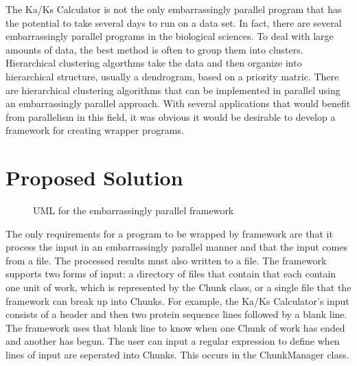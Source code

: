 \documentclass[12pt]{article}
\begin{document}
The Ka/Ks Calculator is not the only embarrassingly parallel program that has the
potential to take several days to run on a data set. In fact, there are several
embarrassingly parallel programs in the biological sciences. To deal with large
amounts of data, the best method is often to group them into clusters. 
Hierarchical clustering algorthms take the data and then organize into
hierarchical structure, usually a dendrogram, based on a priority matric. There 
are hierarchical clustering algorithms that can be implemented in parallel using
an embarrassingly parallel approach.  With several applications that would 
benefit from parallelism in this field, it was obvious it would be desirable to 
develop a framework for creating wrapper programs. \cite{cluster}


\section{Proposed Solution}
\begin{figure}
{}
\caption{UML for the embarrassingly parallel framework}
\label{fig:uml}
\end{figure}
The only requirements for a program to be wrapped by framework are that it 
process the input in an embarrassingly parallel manner and that the input comes 
from a file. The processed results must also written to a file. The framework 
supports two forms of input: a directory of files that contain that each contain
one unit of work, which is represented by the Chunk class, or a single file that
the framework can break up into Chunks. For example, the Ka/Ks Calculator's 
input consists of a header and then two protein sequence lines followed by a 
blank line. The framework uses that blank line to know when one Chunk of work 
has ended and another has begun. The user can input a regular expression to 
define when lines of input are seperated into Chunks. This occurs in the 
ChunkManager class. 
\end{document}
